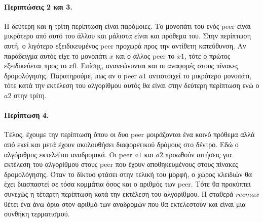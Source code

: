 \paragraph{Περιπτώσεις 2 και 3.}Η δεύτερη και η τρίτη περίπτωση είναι 
παρόμοιες. Το μονοπάτι του ενός peer είναι μικρότερο από αυτό του άλλου 
και μάλιστα είναι και πρόθεμα του. Στην περίπτωση αυτή, ο λιγότερο 
εξειδικευμένος peer προχωρά προς την αντίθετη κατεύθυνση. Αν παράδειγμα 
αυτός είχε το μονοπάτι $x$ και ο άλλος peer το $x1$, τότε ο πρώτος 
εξειδικεύεται προς το $x0$. Επίσης, ανανεώνονται και οι αναφορές στους 
πίνακες δρομολόγησης. Παρατηρούμε, πως αν ο peer $a1$ αντιστοιχεί το 
μικρότερο μονοπάτι, τότε κατά την εκτέλεση του αλγορίθμου αυτός θα είναι 
στην δεύτερη περίπτωση ενώ ο $a2$ στην τρίτη.

\paragraph{Περίπτωση 4.} Τέλος, έχουμε την περίπτωση όπου οι δυο peer 
μοιράζονται ένα κοινό πρόθεμα αλλά από εκεί και μετά έχουν ακολουθήσει 
διαφορετικού δρόμους στο δέντρο. Εδώ ο αλγόριθμος εκτελείται αναδρομικά. 
Οι peer $a1$ και $a2$ προωθούν αιτήσεις για εκτέλεση του αλγορίθμου στους 
peer που έχουν αποθηκευμένους στους πίνακες δρομολόγησης. Όταν 
το δίκτυο φτάσει στην τελική του μορφή, ο χώρος κλειδιών θα έχει διασπαστεί 
σε τόσα κομμάτια όσος και ο αριθμός των peer. Τότε θα προκύπτει συνεχώς η 
τέταρτη περίπτωση κατά την εκτέλεση του αλγορίθμου. Η σταθερά $recmax$ 
θέτει ένα άνω όριο στον αριθμό των αναδρομών που θα εκτελεστούν και είναι 
μια συνθήκη τερματισμού.




